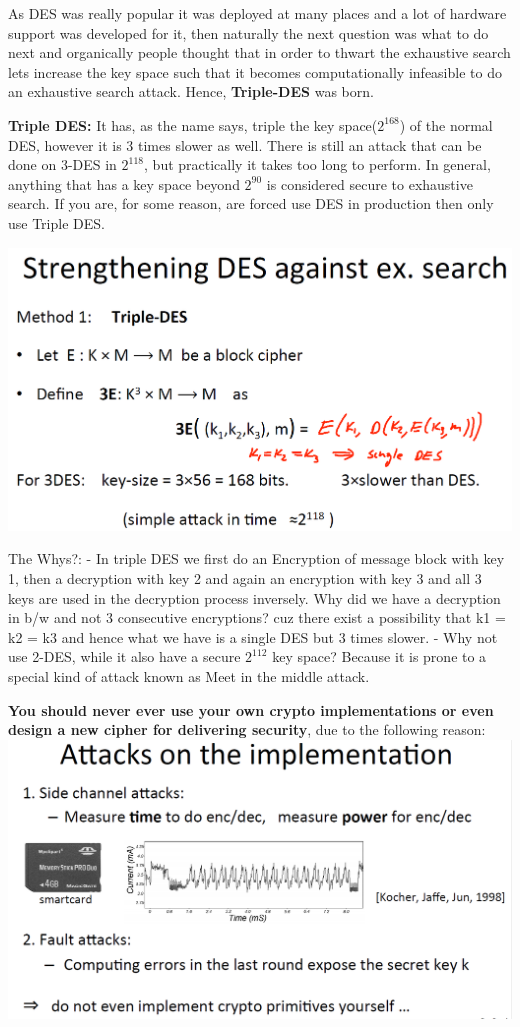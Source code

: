 \documentclass[11pt]{article}
\makeatletter
\def\maxwidth{\ifdim\Gin@nat@width>\linewidth\linewidth
    \else\Gin@nat@width\fi}
\let\Oldincludegraphics\includegraphics
\renewcommand{\includegraphics}[1]{\Oldincludegraphics[width=.8\maxwidth]{#1}}
\makeatother
\begin{document}
As DES was really popular it was deployed at many places and a lot of
hardware support was developed for it, then naturally the next question
was what to do next and organically people thought that in order to
thwart the exhaustive search lets increase the key space such that it
becomes computationally infeasible to do an exhaustive search attack.
Hence, \textbf{Triple-DES} was born.

\textbf{Triple DES:} It has, as the name says, triple the key
space(\(2^{168}\)) of the normal DES, however it is 3 times slower as
well. There is still an attack that can be done on 3-DES in \(2^{118}\),
but practically it takes too long to perform. In general, anything that
has a key space beyond \(2^{90}\) is considered secure to exhaustive
search. If you are, for some reason, are forced use DES in production
then only use Triple DES.

\includegraphics{./Images/3-DES.png}

The Whys?: - In triple DES we first do an Encryption of message block
with key 1, then a decryption with key 2 and again an encryption with
key 3 and all 3 keys are used in the decryption process inversely. Why
did we have a decryption in b/w and not 3 consecutive encryptions? cuz
there exist a possibility that k1 = k2 = k3 and hence what we have is a
single DES but 3 times slower. - Why not use 2-DES, while it also have a
secure \(2^{112}\) key space? Because it is prone to a special kind of
attack known as Meet in the middle attack.

\textbf{You should never ever use your own crypto implementations or
even design a new cipher for delivering security}, due to the following
reason: \includegraphics{./Images/ImplementationAttacks.png}
\end{document}
